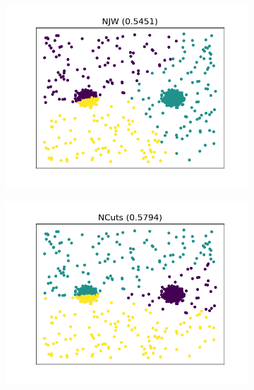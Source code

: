 \begin{figure}[htb]
    \begin{subfigure}[b]{0.32\textwidth}
        \centering
        \includegraphics[width=\textwidth]{../results/plots/dataset_2/NJW_clustering.png}
    \end{subfigure}
    \hfill
    \begin{subfigure}[b]{0.32\textwidth}
        \centering
        \includegraphics[width=\textwidth]{../results/plots/dataset_2/NCuts_clustering.png}
    \end{subfigure}
    \hfill
    \begin{subfigure}[b]{0.32\textwidth}
        \centering

\end{subfigure}
\end{figure}
